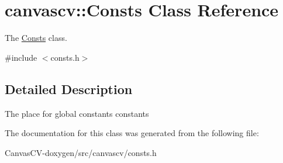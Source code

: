 \hypertarget{classcanvascv_1_1Consts}{}\section{canvascv\+:\+:Consts Class Reference}
\label{classcanvascv_1_1Consts}


The \hyperlink{classcanvascv_1_1Consts}{Consts} class.  




{\ttfamily \#include $<$consts.\+h$>$}



\subsection{Detailed Description}
The place for global constants constants 

The documentation for this class was generated from the following file\+:\begin{DoxyCompactItemize}
\item 
Canvas\+C\+V-\/doxygen/src/canvascv/consts.\+h\end{DoxyCompactItemize}
